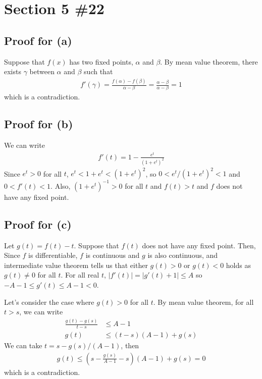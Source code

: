 \documentclass{scrartcl}
\begin{document}
\section{Section 5 \#22}
\subsection{Proof for (a)}
Suppose that \(f(x)\) has two fixed points, \(\alpha\) and \(\beta\).
By mean value theorem, there exists \(\gamma\) between \(\alpha\) and \(\beta\) such that
\begin{align*}
  f'(\gamma) = \frac{f(\alpha) - f(\beta)}{\alpha - \beta} = \frac{\alpha - \beta}{\alpha - \beta} = 1
\end{align*}
which is a contradiction.

\subsection{Proof for (b)}
We can write
\begin{align*}
  f'(t) = 1 - \frac{e^t}{(1 + e^t)^2}
\end{align*}
Since \(e^t > 0\) for all \(t\), \(e^t < 1 + e^t < (1 + e^t)^2\), so \(0 < e^t / (1 + e^t)^2 < 1\) and \(0 < f'(t) < 1\).
Also, \((1 + e^t)^{-1} > 0\) for all \(t\) and \(f(t) > t\) and \(f\) does not have any fixed point.

\subsection{Proof for (c)}
Let \(g(t) = f(t) - t\).
Suppose that \(f(t)\) does not have any fixed point.
Then, Since \(f\) is differentiable, \(f\) is continuous and \(g\) is also continuous, and intermediate value theorem tells us that either \(g(t) > 0\) or \(g(t) < 0\) holds as \(g(t) \not = 0\) for all \(t\).
For all real \(t\), \(|f'(t)| = |g'(t) + 1| \leq A\) so \(-A - 1 \leq g'(t) \leq A - 1 < 0\).

Let's consider the case where \(g(t) > 0\) for all \(t\).
By mean value theorem, for all \(t > s\), we can write
\begin{align}
  \label{sec2_3_mvt} \frac{g(t) - g(s)}{t - s} &\leq A - 1 \\
  \nonumber g(t) &\leq (t - s)(A - 1) + g(s)
\end{align}
We can take \(t = s - g(s) / (A - 1)\), then
\begin{align*}
  g(t) \leq \left( s - \frac{g(s)}{A - 1} - s \right) (A - 1) + g(s) = 0
\end{align*}
which is a contradiction.
\end{document}

